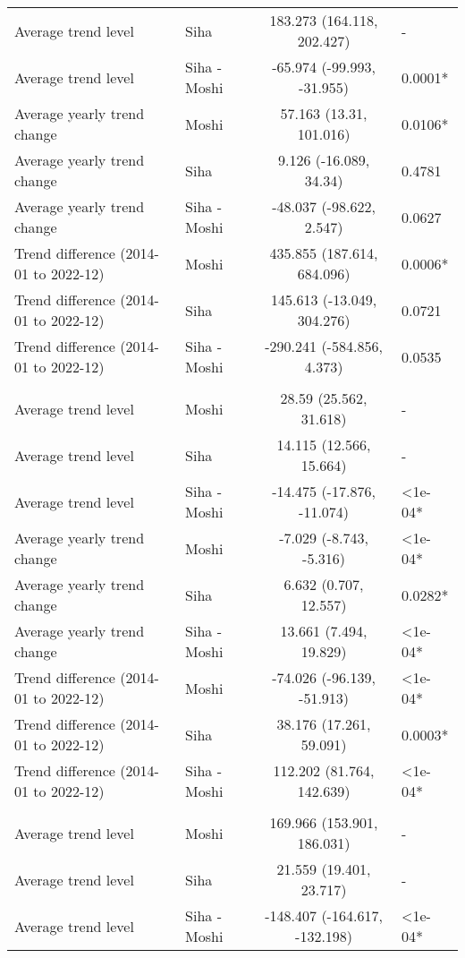 \begin{longtable}{l|lcl}
Average trend level & Siha & 183.273 (164.118, 202.427) & - \\ 
Average trend level & Siha - Moshi & -65.974 (-99.993, -31.955) & 0.0001* \\ 
Average yearly trend change & Moshi & 57.163 (13.31, 101.016) & 0.0106* \\ 
Average yearly trend change & Siha & 9.126 (-16.089, 34.34) & 0.4781 \\ 
Average yearly trend change & Siha - Moshi & -48.037 (-98.622, 2.547) & 0.0627 \\ 
Trend difference (2014-01 to 2022-12) & Moshi & 435.855 (187.614, 684.096) & 0.0006* \\ 
Trend difference (2014-01 to 2022-12) & Siha & 145.613 (-13.049, 304.276) & 0.0721 \\ 
Trend difference (2014-01 to 2022-12) & Siha - Moshi & -290.241 (-584.856, 4.373) & 0.0535 \\ 
\midrule\addlinespace[2.5pt]
\multicolumn{4}{l}{Poisoning} \\[2.5pt] 
\midrule\addlinespace[2.5pt]
Average trend level & Moshi & 28.59 (25.562, 31.618) & - \\ 
Average trend level & Siha & 14.115 (12.566, 15.664) & - \\ 
Average trend level & Siha - Moshi & -14.475 (-17.876, -11.074) & <1e-04* \\ 
Average yearly trend change & Moshi & -7.029 (-8.743, -5.316) & <1e-04* \\ 
Average yearly trend change & Siha & 6.632 (0.707, 12.557) & 0.0282* \\ 
Average yearly trend change & Siha - Moshi & 13.661 (7.494, 19.829) & <1e-04* \\ 
Trend difference (2014-01 to 2022-12) & Moshi & -74.026 (-96.139, -51.913) & <1e-04* \\ 
Trend difference (2014-01 to 2022-12) & Siha & 38.176 (17.261, 59.091) & 0.0003* \\ 
Trend difference (2014-01 to 2022-12) & Siha - Moshi & 112.202 (81.764, 142.639) & <1e-04* \\ 
\midrule\addlinespace[2.5pt]
\multicolumn{4}{l}{Psychoses} \\[2.5pt] 
\midrule\addlinespace[2.5pt]
Average trend level & Moshi & 169.966 (153.901, 186.031) & - \\ 
Average trend level & Siha & 21.559 (19.401, 23.717) & - \\ 
Average trend level & Siha - Moshi & -148.407 (-164.617, -132.198) & <1e-04* \\ 

\end{longtable}
